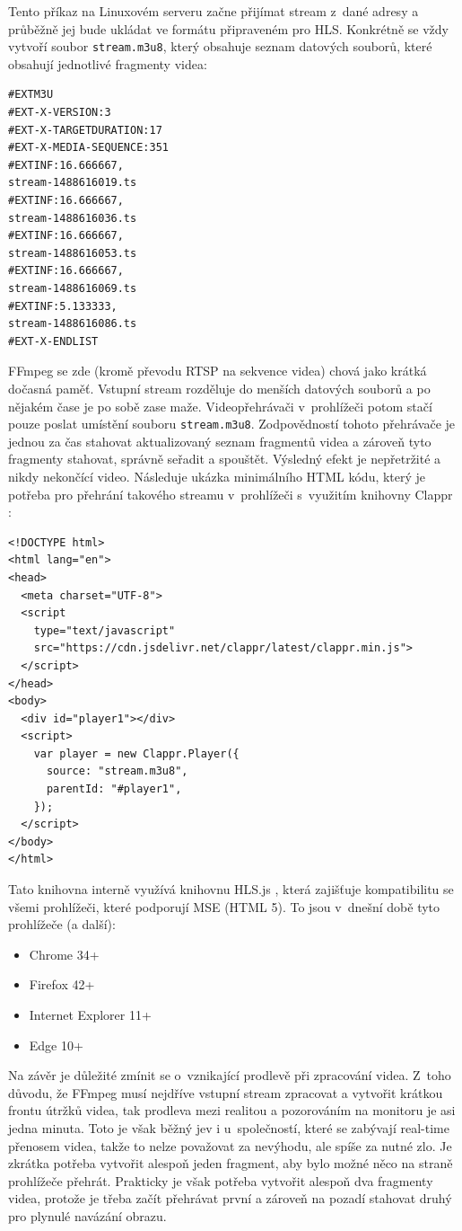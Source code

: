 Tento příkaz na Linuxovém serveru začne přijímat stream z~dané adresy a průběžně jej bude ukládat ve formátu připraveném pro HLS. Konkrétně se vždy vytvoří soubor \texttt{stream.m3u8}, který obsahuje seznam datových souborů, které obsahují jednotlivé fragmenty videa:

\begin{verbatim}
#EXTM3U
#EXT-X-VERSION:3
#EXT-X-TARGETDURATION:17
#EXT-X-MEDIA-SEQUENCE:351
#EXTINF:16.666667,
stream-1488616019.ts
#EXTINF:16.666667,
stream-1488616036.ts
#EXTINF:16.666667,
stream-1488616053.ts
#EXTINF:16.666667,
stream-1488616069.ts
#EXTINF:5.133333,
stream-1488616086.ts
#EXT-X-ENDLIST
\end{verbatim}

FFmpeg se zde (kromě převodu RTSP na sekvence videa) chová jako krátká dočasná paměť. Vstupní stream rozděluje do menších datových souborů a po nějakém čase je po sobě zase maže. Videopřehrávači v~prohlížeči potom stačí pouze poslat umístění souboru \texttt{stream.m3u8}. Zodpovědností tohoto přehrávače je jednou za čas stahovat aktualizovaný seznam fragmentů videa a zároveň tyto fragmenty stahovat, správně seřadit a spouštět. Výsledný efekt je nepřetržité a nikdy nekončící video. Následuje ukázka minimálního HTML kódu, který je potřeba pro přehrání takového streamu v~prohlížeči s~využitím knihovny Clappr \cite{clappr}:

\begin{verbatim}
<!DOCTYPE html>
<html lang="en">
<head>
  <meta charset="UTF-8">
  <script
    type="text/javascript"
    src="https://cdn.jsdelivr.net/clappr/latest/clappr.min.js">
  </script>
</head>
<body>
  <div id="player1"></div>
  <script>
    var player = new Clappr.Player({
      source: "stream.m3u8",
      parentId: "#player1",
    });
  </script>
</body>
</html>
\end{verbatim}

Tato knihovna interně využívá knihovnu HLS.js \cite{hlsjs}, která zajišťuje kompatibilitu se všemi prohlížeči, které podporují MSE (HTML 5). To jsou v~dnešní době tyto prohlížeče (a další):

\begin{itemize}
\item Chrome 34+
\item Firefox 42+
\item Internet Explorer 11+
\item Edge 10+
\end{itemize}

Na závěr je důležité zmínit se o~vznikající prodlevě při zpracování videa. Z~toho důvodu, že FFmpeg musí nejdříve vstupní stream zpracovat a vytvořit krátkou frontu útržků videa, tak prodleva mezi realitou a pozorováním na monitoru je asi jedna minuta. Toto je však běžný jev i u~společností, které se zabývají real-time přenosem videa, takže to nelze považovat za nevýhodu, ale spíše za nutné zlo. Je zkrátka potřeba vytvořit alespoň jeden fragment, aby bylo možné něco na straně prohlížeče přehrát. Prakticky je však potřeba vytvořit alespoň dva fragmenty videa, protože je třeba začít přehrávat první a zároveň na pozadí stahovat druhý pro plynulé navázání obrazu.

